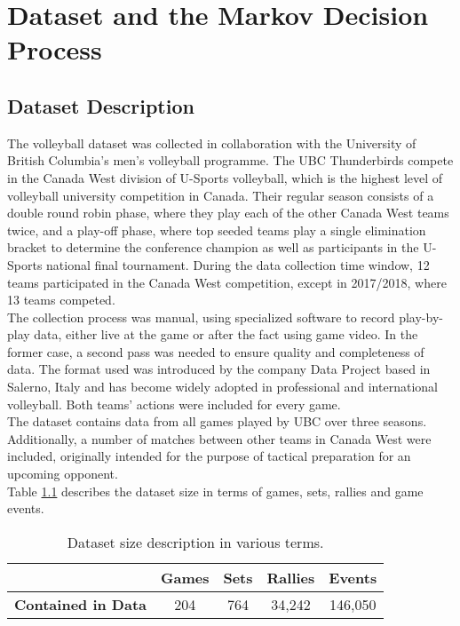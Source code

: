 \documentclass{sfuthesis}
\begin{document}
	\chapter{Dataset and the Markov Decision Process}
	
	\section{Dataset Description}
	The volleyball dataset was collected in collaboration with the University of British Columbia's men's volleyball programme. The UBC Thunderbirds compete in the Canada West division of U-Sports volleyball, which is the highest level of volleyball university competition in Canada. Their regular season consists of a double round robin phase, where they play each of the other Canada West teams twice, and a play-off phase, where top seeded teams play a single elimination bracket to determine the conference champion as well as participants in the U-Sports national final tournament. During the data collection time window, 12 teams participated in the Canada West competition, except in 2017/2018, where 13 teams competed.\\
	The collection process was manual, using specialized software to record play-by-play data, either live at the game or after the fact using game video. In the former case, a second pass was needed to ensure quality and completeness of data. The format used was introduced by the company Data Project based in Salerno, Italy and has become widely adopted in professional and international volleyball. Both teams' actions were included for every game.\\
	The dataset contains data from all games played by UBC over three seasons. Additionally, a number of matches between other teams in Canada West were included, originally intended for the purpose of tactical preparation for an upcoming opponent.\\
	Table \ref{tab:data-numbers} describes the dataset size in terms of games, sets, rallies and game events.\\
	\begin{table}[ht]
		\centering
		\begin{tabular}{c|c|c|c|c}
			& \textbf{Games} & \textbf{Sets} & \textbf{Rallies} & \textbf{Events} \\ \hline
			\textbf{Contained in Data} & 204            & 764           & 34,242           & 146,050        
		\end{tabular}
		\caption{Dataset size description in various terms.}
		\label{tab:data-numbers}
	\end{table}
\end{document}
